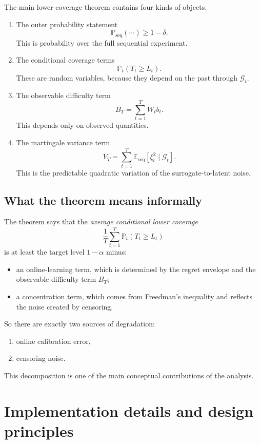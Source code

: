 \documentclass[11pt]{article}
\newcommand{\E}{\mathbb{E}}
\newcommand{\Prob}{\mathbb{P}}
\newcommand{\1}{\mathbf{1}}
\newcommand{\seq}{\mathrm{seq}}
\newcommand{\cG}{\mathcal{G}}
\begin{document}
The main lower-coverage theorem contains four kinds of objects.

\begin{enumerate}[leftmargin=*,itemsep=2pt]
  \item The outer probability statement
  \[
  \Prob_{\seq}(\cdots)\ge 1-\delta.
  \]
  This is probability over the full sequential experiment.

  \item The conditional coverage terms
  \[
  \Prob_t(T_t\ge L_t).
  \]
  These are random variables, because they depend on the past through $\cG_t$.

  \item The observable difficulty term
  \[
  B_T=\sum_{t=1}^T \widetilde W_t b_t.
  \]
  This depends only on observed quantities.

  \item The martingale variance term
  \[
  V_T=\sum_{t=1}^T \E_{\seq}[\xi_t^2\mid \cG_t].
  \]
  This is the predictable quadratic variation of the surrogate-to-latent noise.
\end{enumerate}

\subsection{What the theorem means informally}

The theorem says that the \emph{average conditional lower coverage}
\[
\frac{1}{T}\sum_{t=1}^T\Prob_t(T_t\ge L_t)
\]
is at least the target level $1-\alpha$ minus:
\begin{itemize}[leftmargin=*,itemsep=2pt]
  \item an online-learning term, which is determined by the regret envelope and the observable difficulty term $B_T$;
  \item a concentration term, which comes from Freedman's inequality and reflects the noise created by censoring.
\end{itemize}

So there are exactly two sources of degradation:
\begin{enumerate}[leftmargin=*,itemsep=2pt]
  \item online calibration error,
  \item censoring noise.
\end{enumerate}

This decomposition is one of the main conceptual contributions of the analysis.


\section{Implementation details and design principles}
\label{sec:implementation}
\end{document}
